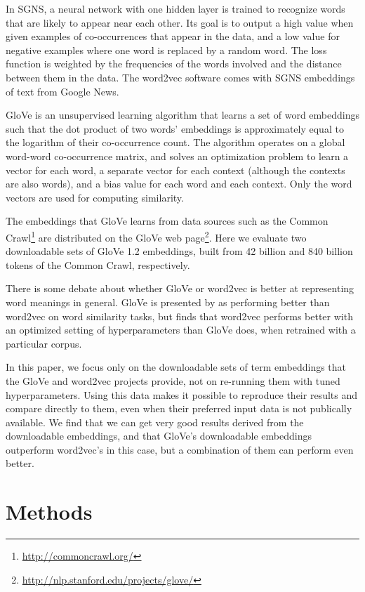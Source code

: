 \documentclass[11pt,letterpaper]{article}
\begin{document}
In SGNS, a neural network with one hidden layer is trained to recognize words
that are likely to appear near each other. Its goal is to output a high value
when given examples of co-occurrences that appear in the data, and a low value
for negative examples where one word is replaced by a random word. The loss
function is weighted by the frequencies of the words involved and the distance
between them in the data. The word2vec software comes with SGNS embeddings
of text from Google News.

GloVe \cite{pennington2014glove} is an unsupervised learning algorithm that
learns a set of word embeddings such that the dot product of two words'
embeddings is approximately equal to the logarithm of their co-occurrence count.
The algorithm operates on a global word-word co-occurrence matrix, and
solves an optimization problem to learn a vector for each word, a separate
vector for each context (although the contexts are also words), and a bias
value for each word and each context. Only the word vectors are used for
computing similarity.

The embeddings that GloVe learns from data sources such as the Common
Crawl\footnote{\url{http://commoncrawl.org/}} are distributed on the GloVe web
page\footnote{\url{http://nlp.stanford.edu/projects/glove/}}. Here we evaluate
two downloadable sets of GloVe 1.2 embeddings, built from 42 billion and 840
billion tokens of the Common Crawl, respectively.

There is some debate about whether GloVe or word2vec is better at representing
word meanings in general. GloVe is presented by 
as performing better than word2vec on word similarity tasks, but
 finds that word2vec performs better with an
optimized setting of hyperparameters than GloVe does, when retrained with a
particular corpus.

In this paper, we focus only on the downloadable sets of term embeddings that
the GloVe and word2vec projects provide, not on re-running them with tuned
hyperparameters. Using this data makes it possible to reproduce their results
and compare directly to them, even when their preferred input data is not
publically available. We find that we can get very good results derived from
the downloadable embeddings, and that GloVe's downloadable embeddings outperform
word2vec's in this case, but a combination of them can perform even better.

\section{Methods}
\end{document}
